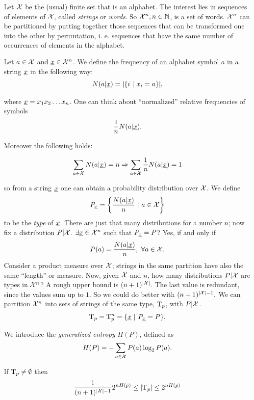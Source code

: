 Let $\mathcal{X}$ be the (usual) finite set that is an alphabet. The interest lies in sequences of elements of $\mathcal{X}$, called \emph{strings} or \emph{words}. So $\mathcal{X}^n, n \in \mathbb{N}$, is a set of words. $\mathcal{X}^n$ can be partitioned by putting together those sequences that can be transformed one into the other by permutation, i. e. sequences that have the same number of occurrences of elements in the alphabet.

Let $a \in \mathcal{X}$ and $\underline{x} \in \mathcal{X}^n$. We define the frequency of an alphabet symbol $a$ in a string $\underline{x}$ in the following way:  
\begin{equation}
N(a | \underline{x}) = |\{i\ |\ x_i = a\}|,
\end{equation}

where $\underline{x} = x_1x_2\ldots x_n$. One can think about ``normalized'' relative frequencies of symbols $$\dfrac{1}{n} N(a|\underline{x}).$$

Moreover the following holds:

$$\sum_{a \in \mathcal{X}} N(a|\underline{x}) = n \Rightarrow \sum_{a\in \mathcal{X}} \dfrac{1}{n}N(a|\underline{x}) = 1$$

so from a string $\underline{x}$ one can obtain a probability distribution over $\mathcal{X}$. We define
\begin{equation}
	P_{\str{x}} = \left\{ \dfrac{N(a|\str{x})}{n}\ |\ a \in \xset \right\}
\end{equation}
to be the \emph{type} of $\underline{x}$. There are just that many distributions for a number $n$; now fix a distribution $P|\mathcal{X}$. $\exists \underline{x} \in \mathcal{X}^n$ such that  $P_{\underline{x}} = P$? Yes, if and only if
$$P(a) = \dfrac{N(a | \underline{x})}{n},\ \forall a \in \mathcal{X}.$$ Consider a product measure over $\mathcal{X}$; strings in the same partition have also the same ``length'' or measure. Now, given $\mathcal{X}$ and $n$, how many distributions $P|\mathcal{X}$ are types in $\mathcal{X}^n$? A rough upper bound is $(n + 1)^{|\mathcal{X}|}$. The last value is redundant, since the values sum up to $1$. So we could do better with $(n + 1)^{|\mathcal{X}| - 1}.$ We can partition $\mathcal{X}^n$ into sets of strings of the same type, $\mathrm{T}_p$, with $P|\mathcal{X}$. $$\mathrm{T}_p = \mathrm{T}_p^n = \{\underline{x}\ |\ P_{\underline{x}} = P\}.$$

We introduce the \emph{generalized entropy} $H(P)$, defined as $$H(P) = -\sum_{a \in \mathcal{X}} P(a)\log_2P(a).$$

\begin{thm} \label{thms:taupcard}
	If $\mathrm{T}_p \not= \emptyset$ then $$\dfrac{1}{(n+1)^{|\mathcal{X}| -1}}2^{nH(p)}\leq |\mathrm{T}_p| \leq 2^{nH(p)}$$
\end{thm}

